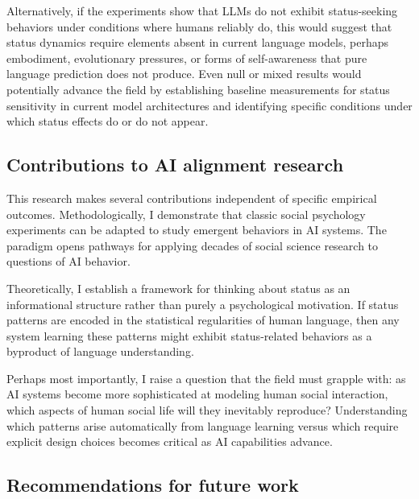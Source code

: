 Alternatively, if the experiments show that LLMs do not exhibit status-seeking behaviors under conditions where humans reliably do, this would suggest that status dynamics require elements absent in current language models, perhaps embodiment, evolutionary pressures, or forms of self-awareness that pure language prediction does not produce. Even null or mixed results would potentially advance the field by establishing baseline measurements for status sensitivity in current model architectures and identifying specific conditions under which status effects do or do not appear.

\subsection*{Contributions to AI alignment research}

This research makes several contributions independent of specific empirical outcomes. Methodologically, I demonstrate that classic social psychology experiments can be adapted to study emergent behaviors in AI systems. The \citet{Berger-1972-Status} paradigm opens pathways for applying decades of social science research to questions of AI behavior.

Theoretically, I establish a framework for thinking about status as an informational structure rather than purely a psychological motivation. If status patterns are encoded in the statistical regularities of human language, then any system learning these patterns might exhibit status-related behaviors as a byproduct of language understanding.


Perhaps most importantly, I raise a question that the field must grapple with: as AI systems become more sophisticated at modeling human social interaction, which aspects of human social life will they inevitably reproduce? Understanding which patterns arise automatically from language learning versus which require explicit design choices becomes critical as AI capabilities advance.

\subsection*{Recommendations for future work}

